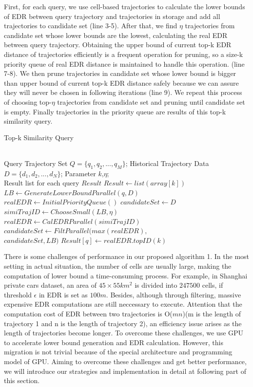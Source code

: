 \documentclass[conference]{IEEEtran}
\begin{document}
First, for each query, we use cell-based trajectories to calculate the lower bounds of EDR between query trajectory and trajectories in storage and add all trajectories to candidate set (line 3-5). After that, we find $\eta$ trajectories from candidate set whose lower bounds are the lowest, calculating the real EDR between query trajectory. Obtaining the upper bound of current top-k EDR distance of trajectories efficiently is a frequent operation for pruning, so a size-k priority queue of real EDR distance is maintained to handle this operation. (line 7-8). We then prune trajectories in candidate set whose lower bound is bigger than upper bound of current top-k EDR distance safely because we can assure they will never be chosen in following iterations (line 9). We repeat this process of choosing top-$\eta$ trajectories from candidate set and pruning until candidate set is empty. Finally trajectories in the priority queue are results of this top-k similarity query.

\begin{algorithm}[htb]
	\caption{Top-k Similarity Query}
	\label{alg:TSQ_1}
	\begin{algorithmic}[1]
		\REQUIRE ~~\\
		Query Trajectory Set $Q=\{ q_{1},q_{2},...,q_{M}\}$; Historical Trajectory Data $D=\{ d_{1},d_{2},...,d_{N}\}$; Parameter $k$,$\eta$;
		\ENSURE ~~\\
		Result list for each query $Result$
		\STATE $Result \leftarrow list(array[k])$
		\STATE $LB \leftarrow GenerateLowerBoundParallel(q,D)$
		\STATE $realEDR \leftarrow InitialPriorityQueue()$
		\STATE $candidateSet \leftarrow D$
		\STATE $simiTrajID \leftarrow ChooseSmall(LB,\eta)$
		\STATE $realEDR \leftarrow CalEDRParallel(simiTrajID)$
		\STATE $candidateSet \leftarrow FiltParallel(max(realEDR),$\\$candidateSet,LB)$
		\ENDWHILE
		\STATE $Result[q] \leftarrow realEDR.topID(k)$
		\ENDFOR
	\end{algorithmic}
\end{algorithm}

There is some challenges of performance in our proposed algorithm 1. In the most setting in actual situation, the number of cells are usually large, making the computation of lower bound a time-consuming process. For example, in Shanghai private cars dataset, an area of $45\times 55 km^{2}$ is divided into $247500$ cells, if threshold $\epsilon$ in EDR is set as $100m$. Besides, although through filtering, massive expensive EDR computations are still neccessary to execute. Attention that the computation cost of EDR between two trajectories is O($mn$)(m is the length of trajectory 1 and n is the length of trajectory 2), an efficiency issue arises as the length of trajectories become longer. To overcome these challenges, we use GPU to accelerate lower bound generation and EDR calculation. However, this migration is not trivial because of the special architecture and programming model of GPU. Aiming to overcome these challenges and get better performance, we will introduce our strategies and implementation in detail at following part of this section.
\end{document}
